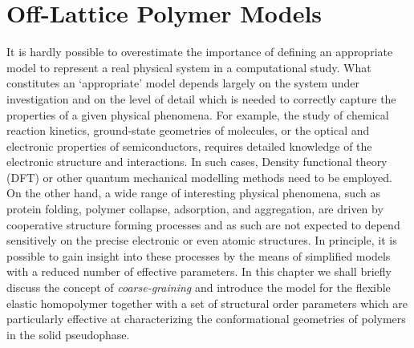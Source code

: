 \documentclass[12pt]{report}
\begin{document}



\chapter{Off-Lattice Polymer Models}
\label{chap:HomopolymerModel}
It is hardly possible to overestimate the importance of defining an appropriate model to represent a real physical system in a computational study. What constitutes an `appropriate' model depends largely on the system under investigation and on the level of detail which is needed to correctly capture the properties of a given physical phenomena. For example, the study of chemical reaction kinetics, ground-state geometries of molecules, or the optical and electronic properties of semiconductors, requires detailed knowledge of the electronic structure and interactions. In such cases, Density functional theory (DFT) or other quantum mechanical modelling methods need to be employed. On the other hand, a wide range of interesting physical phenomena, such as protein folding, polymer collapse, adsorption, and aggregation, are driven by cooperative structure forming processes and as such are not expected to depend sensitively on the precise electronic or even atomic structures. In principle, it is possible to gain insight into these processes by the means of simplified models with a reduced number of effective parameters. In this chapter we shall briefly discuss the concept of \textit{coarse-graining} and introduce the model for the flexible elastic homopolymer together with a set of structural order parameters which are particularly effective at characterizing the conformational geometries of polymers in the solid pseudophase.
\end{document}
